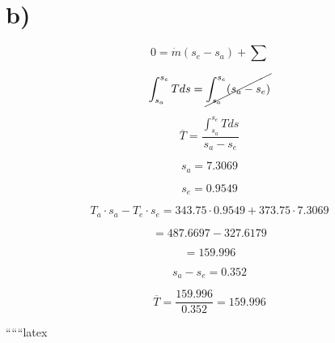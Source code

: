 

\section*{b)}

\[
0 = \dot{m} (s_e - s_a) + \sum
\]

\[
\int_{s_a}^{s_e} T ds = \cancel{\int_{s_a}^{s_e} (s_a - s_e)}
\]

\[
\overline{T} = \frac{\int_{s_a}^{s_e} T ds}{s_a - s_e}
\]

\[
s_a = 7.3069
\]

\[
s_e = 0.9549
\]

\[
T_a \cdot s_a - T_e \cdot s_e = 343.75 \cdot 0.9549 + 373.75 \cdot 7.3069
\]

\[
= 487.6697 - 327.6179
\]

\[
= 159.996
\]

\[
s_a - s_e = 0.352
\]

\[
\overline{T} = \frac{159.996}{0.352} = 159.996
\]

``````latex